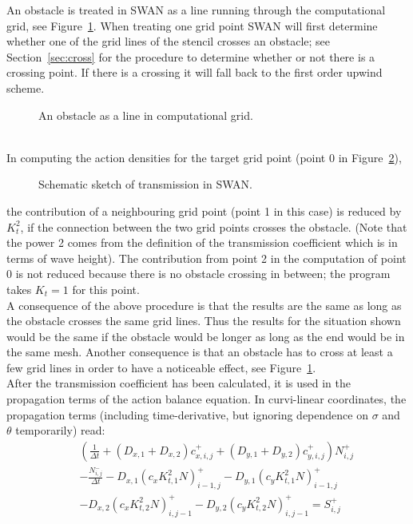 \documentclass[12pt]{book}
\begin{document}
An obstacle is treated in SWAN as a line running through the computational grid, see Figure~\ref{fig:obsgrid}.
When treating one grid point SWAN will first determine whether one of the grid lines of the stencil
crosses an obstacle; see Section~\ref{sec:cross} for the procedure to determine whether or not there is a crossing point.
If there is a crossing it will fall back to the first order upwind scheme.
\begin{figure}[htb]
   \centerline{
              }
      \caption{An obstacle as a line in computational grid.}
      \label{fig:obsgrid}
\end{figure}
\\[2ex]
\noindent
In computing the action densities for the target grid point (point 0 in Figure~\ref{fig:stencil1}),
\begin{figure}[htb]
   \centerline{
              }
      \caption{Schematic sketch of transmission in SWAN.}
      \label{fig:stencil1}
\end{figure}
the contribution of a neighbouring grid point (point 1 in this case) is reduced by $K_t^2$,
if the connection between the two grid points crosses the obstacle.
(Note that the power 2 comes from the definition of the transmission coefficient which is
in terms of wave height).
The contribution from point 2 in the computation of point 0 is not reduced because there is no obstacle
crossing in between; the program takes $K_t=1$ for this point.
\\[2ex]
\noindent
A consequence of the above procedure is that the results are the same as long
as the obstacle crosses the same grid lines.
Thus the results for the situation shown would be the same
if the obstacle would be longer as long as the end would be in the same mesh.
Another consequence is that an obstacle has to cross at least
a few grid lines in order to have a noticeable effect, see Figure~\ref{fig:obsgrid}.
\\[2ex]
\noindent
After the transmission coefficient has been calculated, it is used in
the propagation terms of the action balance equation.
In curvi-linear coordinates, the propagation terms
(including time-derivative, but ignoring dependence on
$\sigma$ and $\theta$ temporarily) read:
\begin{eqnarray}
  && \left ( \frac{1}{\Delta t} + (D_{x,1} + D_{x,2})c_{x,i,j}^+ + (D_{y,1}+D_{y,2}) c_{y,i,j}^+ \right ) N_{i,j}^+ \nonumber \\
  && - \frac{N_{i,j}^-}{\Delta t} - D_{x,1} (c_x K^2_{t,1} N)_{i-1,j}^+ - D_{y,1} (c_y K^2_{t,1} N)_{i-1,j}^+ \nonumber \\
  && - D_{x,2} (c_x K^2_{t,2} N)_{i,j-1}^+ - D_{y,2} (c_y K^2_{t,2} N)_{i,j-1}^+ = S_{i,j}^+
\end{eqnarray}
\end{document}
